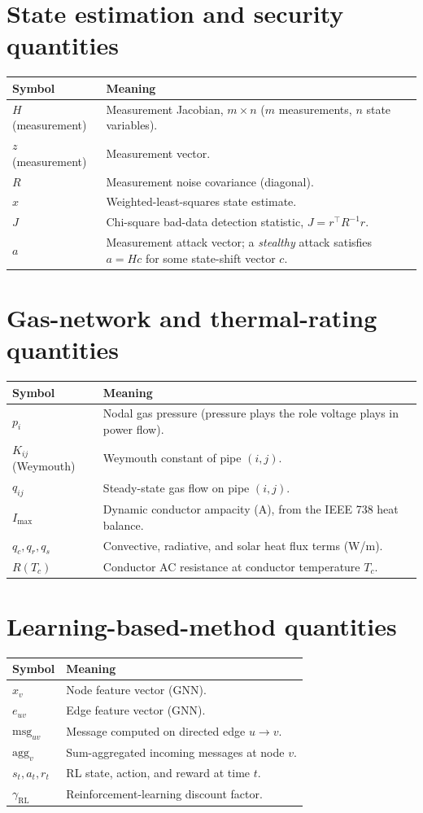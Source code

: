 \documentclass[11pt]{report}
\theoremstyle{plain}
\theoremstyle{definition}
\theoremstyle{remark}
\begin{document}
\section{State estimation and security quantities}
\begin{longtable}{@{}p{3cm}p{11.5cm}@{}}
\toprule
Symbol & Meaning \\
\midrule
\endhead
$H$ (measurement) & Measurement Jacobian, $m\times n$ ($m$ measurements, $n$ state variables). \\
$z$ (measurement) & Measurement vector. \\
$R$ & Measurement noise covariance (diagonal). \\
$\hat x$ & Weighted-least-squares state estimate. \\
$J$ & Chi-square bad-data detection statistic, $J=r^\top R^{-1}r$. \\
$a$ & Measurement attack vector; a \emph{stealthy} attack satisfies $a=Hc$ for some state-shift vector $c$. \\
\bottomrule
\end{longtable}

\section{Gas-network and thermal-rating quantities}
\begin{longtable}{@{}p{3cm}p{11.5cm}@{}}
\toprule
Symbol & Meaning \\
\midrule
\endhead
$p_i$ & Nodal gas pressure (pressure plays the role voltage plays in power flow). \\
$K_{ij}$ (Weymouth) & Weymouth constant of pipe $(i,j)$. \\
$q_{ij}$ & Steady-state gas flow on pipe $(i,j)$. \\
$I_{\max}$ & Dynamic conductor ampacity (A), from the IEEE 738 heat balance. \\
$q_c, q_r, q_s$ & Convective, radiative, and solar heat flux terms (W/m). \\
$R(T_c)$ & Conductor AC resistance at conductor temperature $T_c$. \\
\bottomrule
\end{longtable}

\section{Learning-based-method quantities}
\begin{longtable}{@{}p{3cm}p{11.5cm}@{}}
\toprule
Symbol & Meaning \\
\midrule
\endhead
$x_v$ & Node feature vector (GNN). \\
$e_{uv}$ & Edge feature vector (GNN). \\
$\text{msg}_{uv}$ & Message computed on directed edge $u\to v$. \\
$\text{agg}_v$ & Sum-aggregated incoming messages at node $v$. \\
$s_t, a_t, r_t$ & RL state, action, and reward at time $t$. \\
$\gamma_{\text{RL}}$ & Reinforcement-learning discount factor. \\
\bottomrule
\end{longtable}
\end{document}
